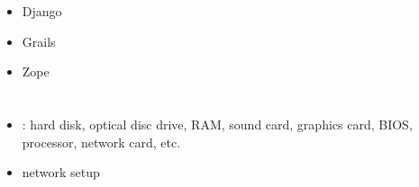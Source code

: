\section*{\webframeworks}

\begin{itemize}
\item Django
\item Grails
\item Zope
\end{itemize}

\section*{\hardware}

\begin{itemize}
\item \exchangeof: hard disk, optical disc drive, RAM, sound card, graphics card, BIOS, processor, network card, etc.
\item network setup
\end{itemize}
